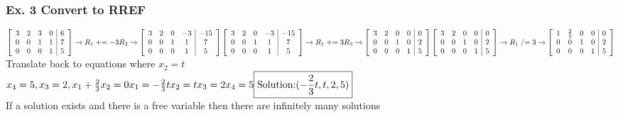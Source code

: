 \documentclass{article}
\begin{document}
\subsubsection*{Ex. 3 Convert to RREF}
$
\left[\begin{array}{cccc|c}
3 & 2 & 3 & 0 & 6 \\
0 & 0 & 1 & 1 & 7 \\
0 & 0 & 0 & 1 & 5
\end{array}\right] \rightarrow R_1 \mathrel{+}= -3R_2 \rightarrow
\left[\begin{array}{cccc|c}
3 & 2 & 0 & -3 & -15 \\
0 & 0 & 1 & 1 & 7 \\
0 & 0 & 0 & 1 & 5
\end{array}\right] \\ [0.1in]
\left[\begin{array}{cccc|c}
3 & 2 & 0 & -3 & -15 \\
0 & 0 & 1 & 1 & 7 \\
0 & 0 & 0 & 1 & 5
\end{array}\right]  \rightarrow R_1 \mathrel{+}= 3R_3 \rightarrow
\left[\begin{array}{cccc|c}
3 & 2 & 0 & 0 & 0 \\
0 & 0 & 1 & 0 & 2 \\
0 & 0 & 0 & 1 & 5
\end{array}\right] \\[0.1in]
\left[\begin{array}{cccc|c}
3 & 2 & 0 & 0 & 0 \\
0 & 0 & 1 & 0 & 2 \\
0 & 0 & 0 & 1 & 5
\end{array}\right]
 \rightarrow R_1 \mathrel{/}= 3 \rightarrow \left[\begin{array}{cccc|c}
1 & \frac{2}{3} & 0 & 0 & 0 \\
0 & 0 & 1 & 0 & 2 \\
0 & 0 & 0 & 1 & 5
\end{array}\right] 
$
\\Translate back to equations where $x_2=t$\\
$x_4 = 5, x_3=2, x_1+\frac{2}{3}x_2=0 \\ x_1 = -\frac{2}{3}t\\x_2=t\\x_3=2\\x_4=5 \boxed{\text{Solution:} (-\frac{2}{3}t, t, 2, 5) }$
\\If a solution exists and there is a free variable then there are infinitely many solutions 
\end{document}
